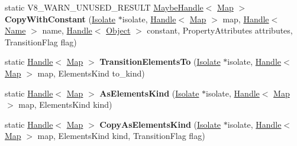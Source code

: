 \begin{DoxyCompactItemize}
\item 
\mbox{\label{classv8_1_1internal_1_1Map_a0c8b0c3a4c8b3879fba955e8cd513946}} 
static V8\+\_\+\+W\+A\+R\+N\+\_\+\+U\+N\+U\+S\+E\+D\+\_\+\+R\+E\+S\+U\+LT \mbox{\hyperlink{classv8_1_1internal_1_1MaybeHandle}{Maybe\+Handle}}$<$ \mbox{\hyperlink{classv8_1_1internal_1_1Map}{Map}} $>$ {\bfseries Copy\+With\+Constant} (\mbox{\hyperlink{classv8_1_1internal_1_1Isolate}{Isolate}} $\ast$isolate, \mbox{\hyperlink{classv8_1_1internal_1_1Handle}{Handle}}$<$ \mbox{\hyperlink{classv8_1_1internal_1_1Map}{Map}} $>$ map, \mbox{\hyperlink{classv8_1_1internal_1_1Handle}{Handle}}$<$ \mbox{\hyperlink{classv8_1_1internal_1_1Name}{Name}} $>$ name, \mbox{\hyperlink{classv8_1_1internal_1_1Handle}{Handle}}$<$ \mbox{\hyperlink{classv8_1_1internal_1_1Object}{Object}} $>$ constant, Property\+Attributes attributes, Transition\+Flag flag)
\item 
\mbox{\label{classv8_1_1internal_1_1Map_a8e869d1aa367e2103b3af0fa4e8e08f7}} 
static \mbox{\hyperlink{classv8_1_1internal_1_1Handle}{Handle}}$<$ \mbox{\hyperlink{classv8_1_1internal_1_1Map}{Map}} $>$ {\bfseries Transition\+Elements\+To} (\mbox{\hyperlink{classv8_1_1internal_1_1Isolate}{Isolate}} $\ast$isolate, \mbox{\hyperlink{classv8_1_1internal_1_1Handle}{Handle}}$<$ \mbox{\hyperlink{classv8_1_1internal_1_1Map}{Map}} $>$ map, Elements\+Kind to\+\_\+kind)
\item 
\mbox{\label{classv8_1_1internal_1_1Map_a64223be5d2946625db2f05849436ce80}} 
static \mbox{\hyperlink{classv8_1_1internal_1_1Handle}{Handle}}$<$ \mbox{\hyperlink{classv8_1_1internal_1_1Map}{Map}} $>$ {\bfseries As\+Elements\+Kind} (\mbox{\hyperlink{classv8_1_1internal_1_1Isolate}{Isolate}} $\ast$isolate, \mbox{\hyperlink{classv8_1_1internal_1_1Handle}{Handle}}$<$ \mbox{\hyperlink{classv8_1_1internal_1_1Map}{Map}} $>$ map, Elements\+Kind kind)
\item 
\mbox{\label{classv8_1_1internal_1_1Map_aa5b62a85413a5e7027093d3976fdfd08}} 
static \mbox{\hyperlink{classv8_1_1internal_1_1Handle}{Handle}}$<$ \mbox{\hyperlink{classv8_1_1internal_1_1Map}{Map}} $>$ {\bfseries Copy\+As\+Elements\+Kind} (\mbox{\hyperlink{classv8_1_1internal_1_1Isolate}{Isolate}} $\ast$isolate, \mbox{\hyperlink{classv8_1_1internal_1_1Handle}{Handle}}$<$ \mbox{\hyperlink{classv8_1_1internal_1_1Map}{Map}} $>$ map, Elements\+Kind kind, Transition\+Flag flag)

\end{DoxyCompactItemize}
